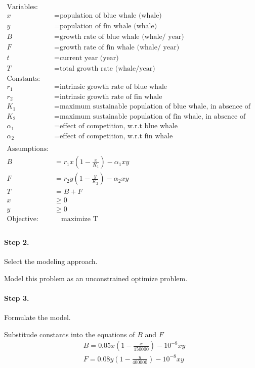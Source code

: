 \documentclass[11pt]{article}
\begin{document}
$$
\begin{aligned}
\text {Variables:}\\
x &= \text {population of blue whale (whale)}\\
y &= \text {population of fin whale (whale)}\\
B &= \text {growth rate of blue whale (whale/ year)}\\
F &= \text {growth rate of fin whale (whale/ year)}\\
t &= \text {current year (year)}\\
T &= \text {total growth rate (whale/year)}\\
\text{Constants:}\\
r_1 &= \text {intrinsic growth rate of blue whale}\\
r_2 &= \text {intrinsic growth rate of fin whale}\\
K_1 &= \text {maximum sustainable population of blue whale, in absence of competition }\\
K_2 &= \text {maximum sustainable population of fin whale, in absence of competition }\\
\alpha _1&= \text{effect of competition, w.r.t blue whale}\\
\alpha _2&= \text{effect of competition, w.r.t fin whale}\\
\\
\text{Assumptions:}\\
B &= r_{1} x\left(1-\frac{x}{K_{1}}\right)-\alpha_{1} x y \\
F &=r_{2} y\left(1-\frac{y}{K_{2}}\right)-\alpha_{2} x y\\
T &= B+F\\
x& \geq 0 \\
y&\geq 0 \\
\text{Objective:}&\quad  \text{maximize T}\\
\end{aligned}
$$

\paragraph{Step 2.} Select the modeling approach.

Model this problem as an unconstrained optimize problem.
\paragraph{Step 3. }Formulate the model.

 Substitude constants into the equations of $B$ and $F$
$$
\begin{align}
&B = 0.05 x\left(1-\frac{x}{150000}\right)-10^{-8} x y \\
&F = 0.08 y\left(1-\frac{y}{400000}\right)-10^{-8} x y\\
\end{align}
$$
\end{document}
